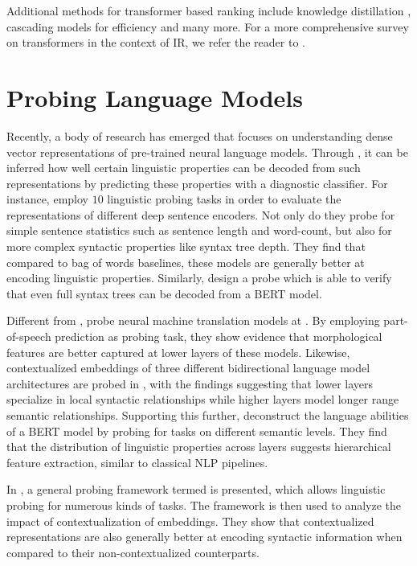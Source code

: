 Additional methods for transformer based ranking include knowledge distillation \citep{DBLP:journals/corr/abs-2009-07531, DBLP:journals/corr/abs-2010-02666}, cascading models for efficiency \citep{Nogueira2019MultiStageDR} and many more. For a more comprehensive survey on transformers in the context of IR, we refer the reader to \citep{10.1145/3437963.3441667}.

\section{Probing Language Models}
Recently, a body of research has emerged that focuses on understanding dense vector representations of pre-trained neural language models. Through , it can be inferred how well certain linguistic properties can be decoded from such representations by predicting these properties with a diagnostic classifier. For instance, \citet{conneau-etal-2018-cram} employ $10$ linguistic probing tasks in order to evaluate the representations of different deep sentence encoders. Not only do they probe for simple sentence statistics such as sentence length and word-count, but also for more complex syntactic properties like syntax tree depth. They find that compared to bag of words baselines, these models are generally better at encoding linguistic properties. Similarly, \citet{Hewitt2019ASP} design a probe which is able to verify that even full syntax trees can be decoded from a BERT model.

Different from \citet{conneau-etal-2018-cram}, \citet{Belinkov2017WhatDN} probe neural machine translation models at . By employing part-of-speech prediction as probing task, they show evidence that morphological features are better captured at lower layers of these models. Likewise, contextualized embeddings of three different bidirectional language model architectures are probed in \citep{peters-etal-2018-dissecting}, with the findings suggesting that lower layers specialize in local syntactic relationships while higher layers model longer range semantic relationships. Supporting this further, \citet{tenney-etal-2019-bert} deconstruct the language abilities of a BERT model by probing for tasks on different semantic levels. They find that the distribution of linguistic properties across layers suggests hierarchical feature extraction, similar to classical NLP pipelines.

In \citep{Tenney2019WhatDY}, a general probing framework termed  is presented, which allows linguistic probing for numerous kinds of tasks. The framework is then used to analyze the impact of contextualization of embeddings. They show that contextualized representations are also generally better at encoding syntactic information when compared to their non-contextualized counterparts.

